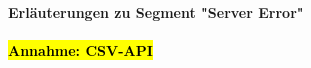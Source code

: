 \documentclass[12pt]{article} %
\begin{document}

\paragraph{Erläuterungen zu Segment "Server Error"} 

\hl{\textbf{Annahme: CSV-API}}
\end{document}
